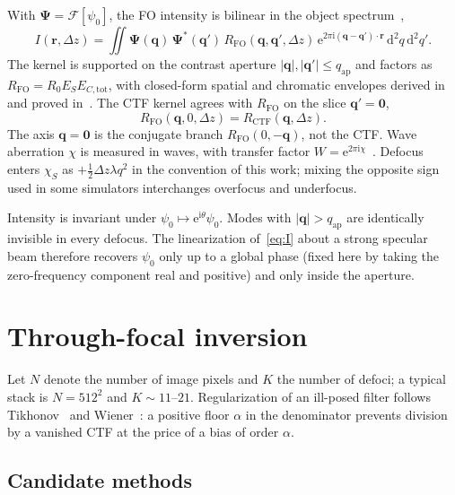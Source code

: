 \documentclass[11pt,a4paper]{article}
\theoremstyle{definition}
\theoremstyle{remark}
\newcommand{\dd}{\mathrm{d}}
\newcommand{\ee}{\mathrm{e}}
\newcommand{\ii}{\mathrm{i}}
\newcommand{\abs}[1]{\lvert#1\rvert}
\newcommand{\qap}{q_{\mathrm{ap}}}
\newcommand{\Dz}{\Delta z}
\newcommand{\RFO}{R_{\mathrm{FO}}}
\newcommand{\RCTF}{R_{\mathrm{CTF}}}
\begin{document}
With $\boldsymbol{\Psi}=\mathcal{F}[\psi_0]$, the FO intensity is bilinear
in the object spectrum~\cite{Goodman2005,Pang2009,Yu2019},
\begin{equation}
\label{eq:I}
I(\mathbf{r},\Dz)
=\iint
\boldsymbol{\Psi}(\mathbf{q})\,\boldsymbol{\Psi}^*(\mathbf{q}')
\,\RFO(\mathbf{q},\mathbf{q}',\Dz)
\,\ee^{2\pi\ii(\mathbf{q}-\mathbf{q}')\cdot\mathbf{r}}
\,\dd^2q\,\dd^2q'.
\end{equation}
The kernel is supported on the contrast aperture
$\abs{\mathbf{q}},\abs{\mathbf{q}'}\le\qap$ and factors as
$\RFO=R_0 E_S E_{C,\mathrm{tot}}$, with closed-form spatial and
chromatic envelopes derived in~\cite{Yu2019} and proved
in~\cite{Lau2026proofs}.
The CTF kernel agrees with $\RFO$ on the slice
$\mathbf{q}'=\mathbf{0}$,
\begin{equation}
\label{eq:slice}
\RFO(\mathbf{q},0,\Dz)=\RCTF(\mathbf{q},\Dz).
\end{equation}
The axis $\mathbf{q}=\mathbf{0}$ is the conjugate branch
$\RFO(0,-\mathbf{q})$, not the CTF.
Wave aberration $\chi$ is measured in waves, with transfer factor
$W=\ee^{2\pi\ii\chi}$~\cite{Tromp2012}.
Defocus enters $\chi_S$ as $+\tfrac12\Dz\lambda q^2$ in the convention
of this work; mixing the opposite sign used in some simulators
interchanges overfocus and underfocus.

Intensity is invariant under $\psi_0\mapsto\ee^{\ii\theta}\psi_0$.
Modes with $\abs{\mathbf{q}}>\qap$ are identically invisible in every
defocus.
The linearization of~\eqref{eq:I} about a strong specular beam
therefore recovers $\psi_0$ only up to a global phase (fixed here by
taking the zero-frequency component real and positive) and only inside
the aperture.

\section{Through-focal inversion}
\label{sec:inverse}

Let $N$ denote the number of image pixels and $K$ the number of
defoci; a typical stack is $N=512^2$ and $K\sim 11$--$21$.
Regularization of an ill-posed filter follows
Tikhonov~\cite{Tikhonov1963} and Wiener~\cite{Wiener1949}: a positive
floor $\alpha$ in the denominator prevents division by a vanished CTF
at the price of a bias of order $\alpha$.

\subsection{Candidate methods}
\label{sec:five}
\end{document}

